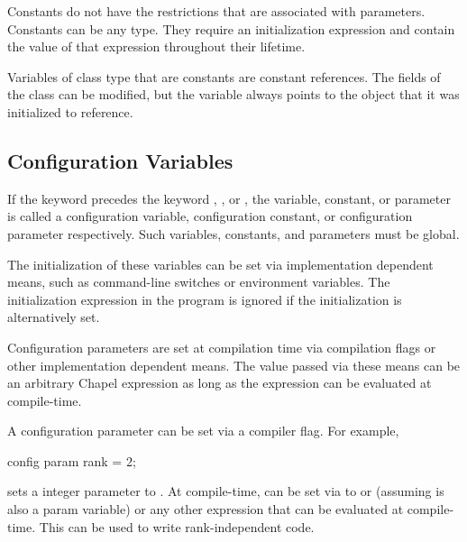 Constants do not have the restrictions that are associated with
parameters.  Constants can be any type.  They require an initialization
expression and contain the value of that expression throughout their lifetime.

Variables of class type that are constants are constant references.
The fields of the class can be modified, but the variable always
points to the object that it was initialized to reference.

\subsection{Configuration Variables}
\label{Configuration_Variables}

If the keyword  precedes the
keyword , , or , the variable,
constant, or parameter is called a configuration variable,
configuration constant, or configuration parameter respectively.  Such
variables, constants, and parameters must be global.

The initialization of these variables can be set via implementation
dependent means, such as command-line switches or environment
variables.  The initialization expression in the program is ignored if
the initialization is alternatively set.

Configuration parameters are set at compilation time via compilation
flags or other implementation dependent means.  The value passed via
these means can be an arbitrary Chapel expression as long as the
expression can be evaluated at compile-time.
\begin{example}
A configuration parameter can be set via a compiler flag.  For example,
\begin{chapel}
config param rank = 2;
\end{chapel}
sets a integer parameter  to .  At
compile-time,  can be set via to  or 
(assuming  is also a param variable) or any other expression
that can be evaluated at compile-time.  This can be used to write
rank-independent code.
\end{example}
